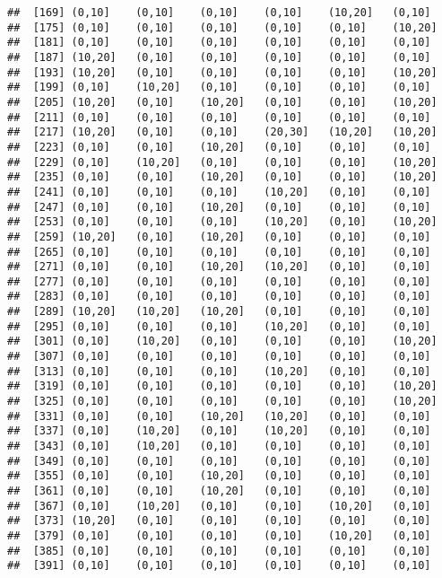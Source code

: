 \documentclass[]{article}
\begin{document}
\begin{verbatim}
##  [169] (0,10]    (0,10]    (0,10]    (0,10]    (10,20]   (0,10]   
##  [175] (0,10]    (0,10]    (0,10]    (0,10]    (0,10]    (10,20]  
##  [181] (0,10]    (0,10]    (0,10]    (0,10]    (0,10]    (0,10]   
##  [187] (10,20]   (0,10]    (0,10]    (0,10]    (0,10]    (0,10]   
##  [193] (10,20]   (0,10]    (0,10]    (0,10]    (0,10]    (10,20]  
##  [199] (0,10]    (10,20]   (0,10]    (0,10]    (0,10]    (0,10]   
##  [205] (10,20]   (0,10]    (10,20]   (0,10]    (0,10]    (10,20]  
##  [211] (0,10]    (0,10]    (0,10]    (0,10]    (0,10]    (0,10]   
##  [217] (10,20]   (0,10]    (0,10]    (20,30]   (10,20]   (10,20]  
##  [223] (0,10]    (0,10]    (10,20]   (0,10]    (0,10]    (0,10]   
##  [229] (0,10]    (10,20]   (0,10]    (0,10]    (0,10]    (10,20]  
##  [235] (0,10]    (0,10]    (10,20]   (0,10]    (0,10]    (10,20]  
##  [241] (0,10]    (0,10]    (0,10]    (10,20]   (0,10]    (0,10]   
##  [247] (0,10]    (0,10]    (10,20]   (0,10]    (0,10]    (0,10]   
##  [253] (0,10]    (0,10]    (0,10]    (10,20]   (0,10]    (10,20]  
##  [259] (10,20]   (0,10]    (10,20]   (0,10]    (0,10]    (0,10]   
##  [265] (0,10]    (0,10]    (0,10]    (0,10]    (0,10]    (0,10]   
##  [271] (0,10]    (0,10]    (10,20]   (10,20]   (0,10]    (0,10]   
##  [277] (0,10]    (0,10]    (0,10]    (0,10]    (0,10]    (0,10]   
##  [283] (0,10]    (0,10]    (0,10]    (0,10]    (0,10]    (0,10]   
##  [289] (10,20]   (10,20]   (10,20]   (0,10]    (0,10]    (0,10]   
##  [295] (0,10]    (0,10]    (0,10]    (10,20]   (0,10]    (0,10]   
##  [301] (0,10]    (10,20]   (0,10]    (0,10]    (0,10]    (10,20]  
##  [307] (0,10]    (0,10]    (0,10]    (0,10]    (0,10]    (0,10]   
##  [313] (0,10]    (0,10]    (0,10]    (10,20]   (0,10]    (0,10]   
##  [319] (0,10]    (0,10]    (0,10]    (0,10]    (0,10]    (10,20]  
##  [325] (0,10]    (0,10]    (0,10]    (0,10]    (0,10]    (10,20]  
##  [331] (0,10]    (0,10]    (10,20]   (10,20]   (0,10]    (0,10]   
##  [337] (0,10]    (10,20]   (0,10]    (10,20]   (0,10]    (0,10]   
##  [343] (0,10]    (10,20]   (0,10]    (0,10]    (0,10]    (0,10]   
##  [349] (0,10]    (0,10]    (0,10]    (0,10]    (0,10]    (0,10]   
##  [355] (0,10]    (0,10]    (10,20]   (0,10]    (0,10]    (0,10]   
##  [361] (0,10]    (0,10]    (10,20]   (0,10]    (0,10]    (0,10]   
##  [367] (0,10]    (10,20]   (0,10]    (0,10]    (10,20]   (0,10]   
##  [373] (10,20]   (0,10]    (0,10]    (0,10]    (0,10]    (0,10]   
##  [379] (0,10]    (0,10]    (0,10]    (0,10]    (10,20]   (0,10]   
##  [385] (0,10]    (0,10]    (0,10]    (0,10]    (0,10]    (0,10]   
##  [391] (0,10]    (0,10]    (0,10]    (0,10]    (0,10]    (0,10]   

\end{verbatim}
\end{document}
